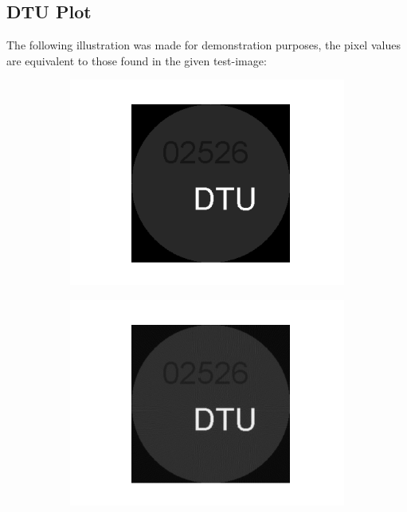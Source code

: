 \documentclass{article}
\begin{document}
\subsection{DTU Plot}
The following illustration was made for demonstration purposes, the pixel values are equivalent to those found in the given test-image:
\begin{figure}[H]
\centering
\begin{subfigure}[t]{0.3\linewidth}
\centering
\includegraphics[width=\linewidth]{code/test_logo.png}
\end{subfigure}
\begin{subfigure}[t]{0.4\linewidth}
\centering
\includegraphics[width=\linewidth]{code/test_logo_recov.png}
\end{subfigure}

\end{figure}
\end{document}
